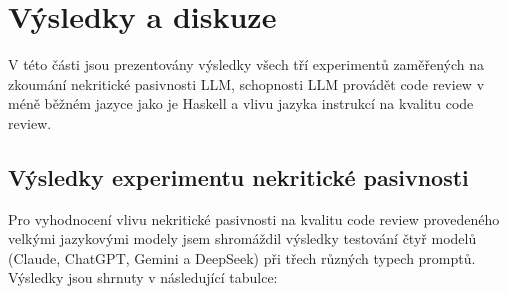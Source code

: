 \documentclass[12pt, a4paper]{article}
\begin{document}
\section{Výsledky a diskuze}
V této části jsou prezentovány výsledky všech tří experimentů zaměřených na zkoumání nekritické pasivnosti LLM, schopnosti LLM provádět code review v méně běžném jazyce jako je Haskell a vlivu jazyka instrukcí na kvalitu code review.

\subsection{Výsledky experimentu nekritické pasivnosti}
Pro vyhodnocení vlivu nekritické pasivnosti na kvalitu code review provedeného velkými jazykovými modely jsem shromáždil výsledky testování čtyř modelů (Claude, ChatGPT, Gemini a DeepSeek) při třech různých typech promptů. Výsledky jsou shrnuty v následující tabulce:
\end{document}
